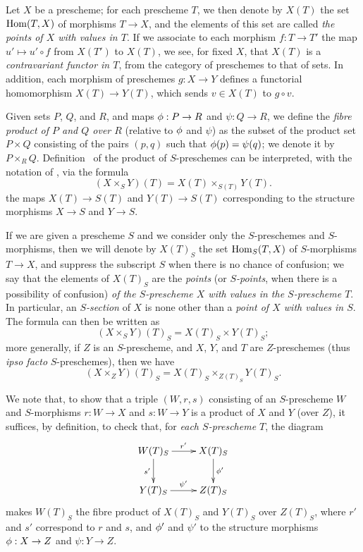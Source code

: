\begin{env}[3.4.1]
\label{1.3.4.1}
Let $X$ be a prescheme; for each prescheme $T$, we then denote by $X(T)$ the set
$\operatorname{Hom}(T,X)$ of morphisms $T\to X$, and the elements of this set are called
\emph{the points of $X$ with values in $T$}. If we associate to each morphism
$f:T\to T'$ the map $u'\mapsto u'\circ f$ from $X(T')$ to $X(T)$, we see,
for fixed $X$, that $X(T)$ is a \emph{contravariant functor in $T$}, from the
category of preschemes to that of sets. In addition, each morphism of preschemes
$g:X\to Y$ defines a functorial homomorphism $X(T)\to Y(T)$, which sends
$v\in X(T)$ to $g\circ v$.
\end{env}

\begin{env}[3.4.2]
\label{1.3.4.2}
Given sets $P$, $Q$, and $R$, and maps $\vphi:P\to R$ and $\psi:Q\to R$, we define the
\emph{fibre product of $P$ and $Q$ over $R$} (relative to $\phi$ and $\psi$) as the subset
of
the product set $P\times Q$ consisting of the pairs $(p,q)$ such that $\phi(p)=\psi(q)$; we
denote it by $P\times_R Q$. Definition~ of the product
of $S$-preschemes can be interpreted, with the notation of ,
via the formula
\[
\label{1.3.4.2.1}
  (X\times_S Y)(T)=X(T)\times_{S(T)}Y(T).
  \tag{3.4.2.1}
\]
the maps $X(T)\to S(T)$ and $Y(T)\to S(T)$ corresponding to the structure morphisms
$X\to S$ and $Y\to S$.
\end{env}

\begin{env}[3.4.3]
\label{1.3.4.3}
If we are given a prescheme $S$ and we consider only the $S$-preschemes and $S$-morphisms,
then we will denote by $X(T)_S$ the set $\operatorname{Hom}_S(T,X)$ of $S$-morphisms $T\to X$, and suppress
the subscript $S$ when there is no chance of confusion; we say that the elements of $X(T)_S$
are the \emph{points} (or \emph{$S$-points}, when there is a possibility of confusion)
\emph{of the $S$-prescheme $X$ with values in the $S$-prescheme $T$}. In particular, an
\emph{$S$-section} of $X$ is none other than a \emph{point of $X$ with values in $S$}. The
formula  can then be written as
\[
\label{1.3.4.3.1}
  (X\times_S Y)(T)_S=X(T)_S\times Y(T)_S;
  \tag{3.4.3.1}
\]
more generally, if $Z$ is an $S$-prescheme, and $X$, $Y$, and $T$ are $Z$-preschemes (thus
\emph{ipso facto} $S$-preschemes), then we have
\[
\label{1.3.4.3.2}
  (X\times_Z Y)(T)_S=X(T)_S\times_{Z(T)_S}Y(T)_S.
  \tag{3.4.3.2}
\]

We note that, to show that a triple $(W,r,s)$ consisting of an $S$-prescheme $W$ and
$S$-morphisms $r:W\to X$ and $s:W\to Y$ is a product of $X$ and $Y$ (over $Z$), it suffices, by
definition, to check that, for \emph{each $S$-prescheme $T$}, the diagram
\[
  \xymatrix{
    W(T)_S\ar[r]^{r'}\ar[d]_{s'} &
    X(T)_S\ar[d]^{\vphi'}\\
    Y(T)_S\ar[r]^{\psi'} &
    Z(T)_S
  }
\]
makes $W(T)_S$ the fibre product of $X(T)_S$ and $Y(T)_S$ over $Z(T)_S$, where $r'$ and $s'$
correspond to $r$ and $s$, and $\phi'$ and $\psi'$ to the structure morphisms $\vphi:X\to Z$ and $\psi:Y\to Z$.
\end{env}

